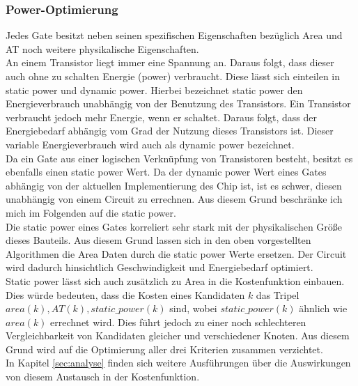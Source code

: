 \documentclass[11pt, a4paper, german]{article}
\begin{document}
\subsubsection{Power-Optimierung}
Jedes Gate besitzt neben seinen spezifischen Eigenschaften bezüglich Area und AT noch weitere physikalische Eigenschaften.\\
An einem Transistor liegt immer eine Spannung an. Daraus folgt, dass dieser auch ohne zu schalten Energie (power) verbraucht. Diese lässt sich einteilen in static power und dynamic power. Hierbei bezeichnet static power den Energieverbrauch unabhängig von der Benutzung des Transistors. Ein Transistor verbraucht jedoch mehr Energie, wenn er schaltet. Daraus folgt, dass der Energiebedarf abhängig vom Grad der Nutzung dieses Transistors ist. Dieser variable Energieverbrauch wird auch als dynamic power bezeichnet.\\
Da ein Gate aus einer logischen Verknüpfung von Transistoren besteht, besitzt es ebenfalls einen static power Wert. Da der dynamic power Wert eines Gates abhängig von der aktuellen Implementierung des Chip ist, ist es schwer, diesen unabhängig von einem Circuit zu errechnen. Aus diesem Grund beschränke ich mich im Folgenden auf die static power. \\
Die static power eines Gates korreliert sehr stark mit der physikalischen Größe dieses Bauteils. Aus diesem Grund lassen sich in den oben vorgestellten Algorithmen die Area Daten durch die static power Werte ersetzen. Der Circuit wird dadurch hinsichtlich Geschwindigkeit und Energiebedarf optimiert. \\
Static power lässt sich auch zusätzlich zu Area in die Kostenfunktion einbauen. Dies würde bedeuten, dass die Kosten eines Kandidaten $k$ das Tripel $area(k), AT(k), static\_power(k)$ sind, wobei $static\_power(k)$ ähnlich wie $area(k)$ errechnet wird. Dies führt jedoch zu einer noch schlechteren Vergleichbarkeit von Kandidaten gleicher und verschiedener Knoten. Aus diesem Grund wird auf die Optimierung aller drei Kriterien zusammen verzichtet. \\
In Kapitel \ref{sec:analyse} finden sich weitere Ausführungen über die Auswirkungen von diesem Austausch in der Kostenfunktion.
	
\end{document}
